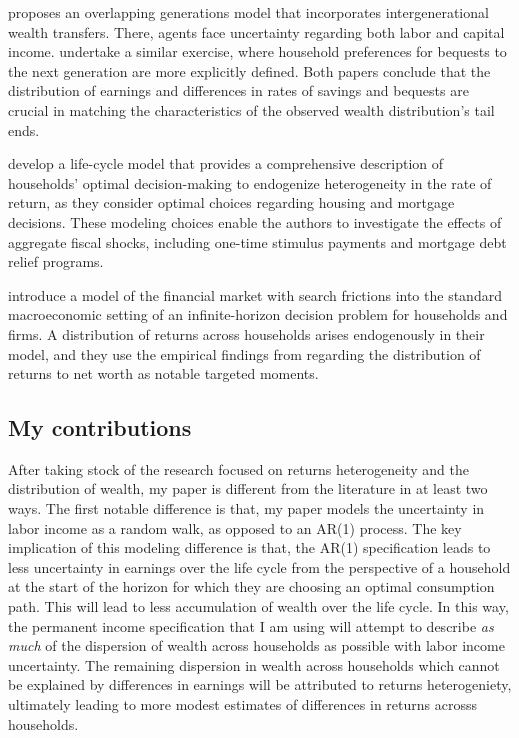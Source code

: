 \par \cite{Benhabib2019} proposes an overlapping generations model that incorporates intergenerational wealth transfers. There, agents face uncertainty regarding both labor and capital income. \cite{jbabml17} undertake a similar exercise, where household preferences for bequests to the next generation are more explicitly defined. Both papers conclude that the distribution of earnings and differences in rates of savings and bequests are crucial in matching the characteristics of the observed wealth distribution's tail ends.

\par \cite{Guler2022} develop a life-cycle model that provides a comprehensive description of households' optimal decision-making to endogenize heterogeneity in the rate of return, as they consider optimal choices regarding housing and mortgage decisions. These modeling choices enable the authors to investigate the effects of aggregate fiscal shocks, including one-time stimulus payments and mortgage debt relief programs.

\par \cite{Menzio2025} introduce a model of the financial market with search frictions into the standard macroeconomic setting of an infinite-horizon decision problem for households and firms. A distribution of returns across households arises endogenously in their model, and they use the empirical findings from \cite{aflgdmlp20} regarding the distribution of returns to net worth as notable targeted moments.

\subsection{My contributions}

\par After taking stock of the research focused on returns heterogeneity and the distribution of wealth, my paper is different from the literature in at least two ways. The first notable difference is that, my paper models the uncertainty in labor income as a random walk, as opposed to an AR(1) process. The key implication of this modeling difference is that, the AR(1) specification leads to less uncertainty in earnings over the life cycle from the perspective of a household at the start of the horizon for which they are choosing an optimal consumption path. This will lead to less accumulation of wealth over the life cycle. In this way, the permanent income specification that I am using will attempt to describe \textit{as much} of the dispersion of wealth across households as possible with labor income uncertainty. The remaining dispersion in wealth across households which cannot be explained by differences in earnings will be attributed to returns heterogeniety, ultimately leading to more modest estimates of differences in returns acrosss households.

